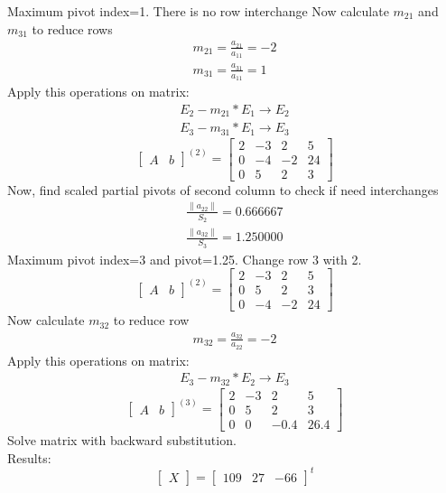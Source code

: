 \documentclass{article}
\begin{document}
Maximum pivot index=1. There is no row interchange
Now calculate $m_{21}$ and $m_{31}$ to reduce rows 
\begin{align}
	m_{21}=\frac{a_{21}}{a_{11}}=-2\\
	m_{31}=\frac{a_{31}}{a_{11}}=1
\end{align}
Apply this operations on matrix:
\begin{align}
	E_{2}-m_{21}*E_{1}\rightarrow E_{2}\\
	E_{3}-m_{31}*E_{1}\rightarrow E_{3}
\end{align}
\[
\left[
\begin{array}{c|c}
A&b
\end{array}
\right]^{(2)}
=
\left[
\begin{array}{ccc|c}
	2&-3&2&5\\
	0&-4&-2&24\\
	0&5&2&3 
\end{array}
\right]
\]
Now, find scaled partial pivots of second column to check if need interchanges
\begin{align}
	\frac{\|a_{22}\|}{S_{2}}=0.666667\\
	\frac{\|a_{32}\|}{S_{3}}=1.250000
\end{align}
Maximum pivot index=3 and pivot=1.25. Change row 3 with 2.
\[
\left[
\begin{array}{c|c}
A&b
\end{array}
\right]^{(2)}
=
\left[
\begin{array}{ccc|c}
	2&-3&2&5\\
	0&5&2&3\\
	0&-4&-2&24
\end{array}
\right]
\]
Now calculate $m_{32}$ to reduce row 
\begin{align}
	m_{32}=\frac{a_{32}}{a_{22}}=-2
\end{align}
Apply this operations on matrix:
\begin{align}
	E_{3}-m_{32}*E_{2}\rightarrow E_{3}
\end{align}
\[
\left[
\begin{array}{c|c}
A&b
\end{array}
\right]^{(3)}
=
\left[
\begin{array}{ccc|c}
	2&-3&2&5\\
	0&5&2&3\\
	0&0&-0.4&26.4 
\end{array}
\right]
\]
Solve matrix with backward substitution.\\
Results:
\[
\begin{bmatrix}
X
\end{bmatrix}
=
\begin{bmatrix}
	109&27&-66
\end{bmatrix}^t
\]
\end{document}
